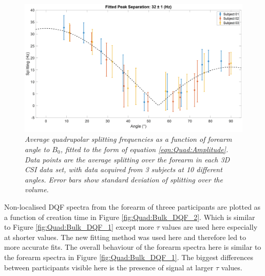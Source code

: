 \documentclass[class=article, crop=false]{standalone}
\begin{document}
\begin{figure}
    \centering
    \includegraphics[width=1\textwidth]{Figures/Quad/Split_Angle_2.png}
    \caption{\textit{Average quadrupolar splitting frequencies as a function of forearm angle to $B_0$, fitted to the form of equation \ref{eqn:Quad:Amplitude}. Data points are the average splitting over the forearm in each 3D CSI data set, with data acquired from 3 subjects at 10 different angles. Error bars show standard deviation of splitting over the volume.}}
    \label{fig:Quad:Split_Angle_2}
\end{figure}

Non-localised DQF spectra from the forearm of threee participants are plotted as a function of creation time in Figure \ref{fig:Quad:Bulk_DQF_2}. Which is similar to Figure \ref{fig:Quad:Bulk_DQF_1} except more $\tau$ values are used here especially at shorter values. The new fitting method was used here and therefore led to more accurate fits. The overall behaviour of the forearm spectra here is similar to the forearm spectra in Figure \ref{fig:Quad:Bulk_DQF_1}. The biggest differences between participants visible here is the presence of signal at larger $\tau$ values.
\end{document}
